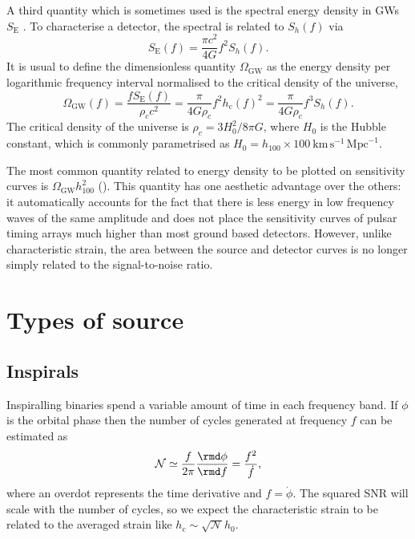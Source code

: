 \documentclass[fleqn,12pt]{iopart}
\newcommand{\sub}[1]{\ensuremath{_\mathrm{#1}}}
\begin{document}
A third quantity which is sometimes used is the spectral energy density in GWs $S\sub{E}$ . To characterise a detector, the spectral is related to $S_{h}(f)$ via \citep{Hellings1983}
\begin{equation}\label{eq:spectralenergydensity}
S\sub{E}(f)=\frac{\pi c^{2}}{4G} f^{2}S_{h}(f).
\end{equation}
It is usual to define the dimensionless quantity $\Omega\sub{GW}$ as the energy density per logarithmic frequency interval normalised to the critical density of the universe,
\begin{equation}\label{eq:omega} 
\Omega\sub{GW}(f) = \frac{fS\sub{E}(f)}{\rho_{c}c^{2}} = \frac{\pi}{4G\rho_{c}}f^{2}h\sub{c}(f)^{2} = \frac{\pi}{4G\rho_{c}}f^{3}S_{h}(f).
\end{equation}
The critical density of the universe is $\rho_{c} = 3H_0^{2}/{8\pi G}$, where $H_0$ is the Hubble constant, which is commonly parametrised as $H_0 = h_{100}\times 100~\textrm{km}\,\textrm{s}^{-1}\,\textrm{Mpc}^{-1}$.

The most common quantity related to energy density to be plotted on sensitivity curves is $\Omega_{\textrm{GW}}h_{100}^{2}$ (). This quantity has one aesthetic advantage over the others: it automatically accounts for the fact that there is less energy in low frequency waves of the same amplitude and does not place the sensitivity curves of pulsar timing arrays much higher than most ground based detectors. However, unlike characteristic strain, the area between the source and detector curves is no longer simply related to the signal-to-noise ratio.

\section{Types of source}\label{sec:voc}

\subsection{Inspirals}\label{sec:insp}

Inspiralling binaries spend a variable amount of time in each frequency band. If $\phi$ is the orbital phase then the number of cycles generated at frequency $f$ can be estimated as
\begin{equation}\label{eq:inspiral}
\mathcal{N} \simeq \frac{f}{2\pi}\frac{\rmd\phi}{\rmd f} = \frac{f^{2}}{\dot{f}},
\end{equation}
where an overdot represents the time derivative and $f = \dot{\phi}$. The squared SNR will scale with the number of cycles, so we expect the characteristic strain to be related to the averaged strain like $h\sub{c} \sim \sqrt{\mathcal{N}}h_0$.
\end{document}
